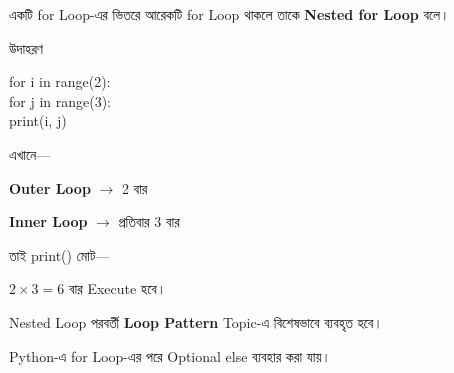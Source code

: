 

একটি
\textenglish{\ttfamily for}
Loop-এর ভিতরে আরেকটি
\textenglish{\ttfamily for}
Loop থাকলে তাকে
\textbf{Nested for Loop} বলে।

\begin{examplebox}{উদাহরণ}

\begin{codebox}
\begin{english}
\ttfamily
for i in range(2):\\
\hspace*{4mm}for j in range(3):\\
\hspace*{8mm}print(i, j)
\end{english}
\end{codebox}

এখানে—

\begin{center}

\textbf{Outer Loop}
\(\longrightarrow\)
2 বার

\qquad

\textbf{Inner Loop}
\(\longrightarrow\)
প্রতিবার 3 বার

\end{center}

তাই
\textenglish{\ttfamily print()}
মোট—

\begin{center}

\(2 \times 3 = 6\) বার Execute হবে।

\end{center}

\end{examplebox}

\begin{rememberbox}

Nested Loop পরবর্তী
\textbf{Loop Pattern}
Topic-এ বিশেষভাবে ব্যবহৃত হবে।

\end{rememberbox}



Python-এ
\textenglish{\ttfamily for}
Loop-এর পরে Optional
\textenglish{\ttfamily else}
ব্যবহার করা যায়।

